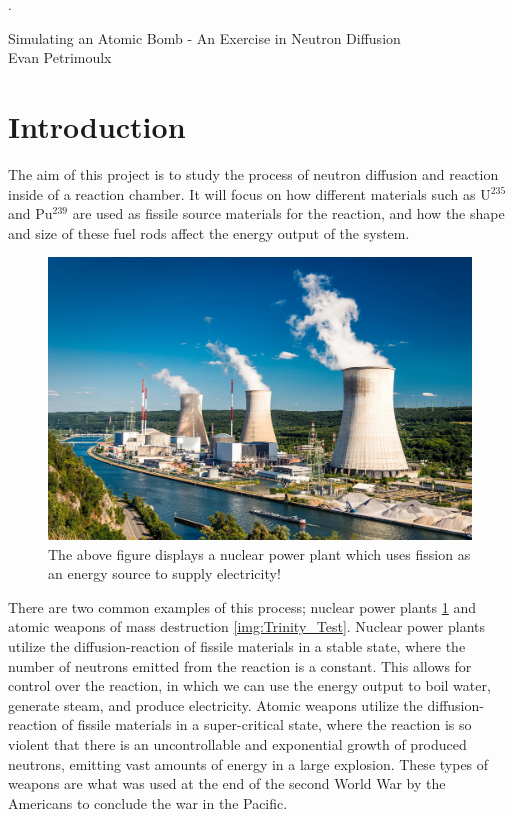 \documentclass[letterpaper, 12pt]{article}
\begin{document}
   \setcounter{page}{0}.
    \begin{center}
        {\Large Simulating an Atomic Bomb - An Exercise in Neutron Diffusion\\}
        \vspace{0.5em}
        Evan Petrimoulx \\
    \end{center}

    \pagestyle{fancy}
    \fancyhf{}
    \fancyhead[R]{\today}
    \fancyfoot[R]{}
    \setlength{\droptitle}{-6em}

    \vspace{0.25cm}

    \tableofcontents
    \newpage
    \section{ Introduction}
      The aim of this project is to study the process of neutron diffusion and reaction inside of a reaction chamber. It will focus on how different materials such as U$^{235}$ and Pu$^{239}$ are used as fissile source materials for the reaction, and how the shape and size of these fuel rods affect the energy output of the system. \\

      \begin{figure}[h!]
         \centering
         \includegraphics[width = 0.7\linewidth]{Images/Nuclear_Power_Plant.jpg}
         \caption{The above figure displays a nuclear power plant which uses fission as an energy source to supply electricity!}
         \label{img:Nuclear_Reactor}
      \end{figure}


      There are two common examples of this process; nuclear power plants \ref{img:Nuclear_Reactor} and atomic weapons of mass destruction \ref{img:Trinity_Test}. Nuclear power plants utilize the diffusion-reaction of fissile materials in a stable state, where the number of neutrons emitted from the reaction is a constant. This allows for control over the reaction, in which we can use the energy output to boil water, generate steam, and produce electricity. Atomic weapons utilize the diffusion-reaction of fissile materials in a super-critical state, where the reaction is so violent that there is an uncontrollable and exponential growth of produced neutrons, emitting vast amounts of energy in a large explosion. These types of weapons are what was used at the end of the second World War by the Americans to conclude the war in the Pacific. \\
\end{document}
